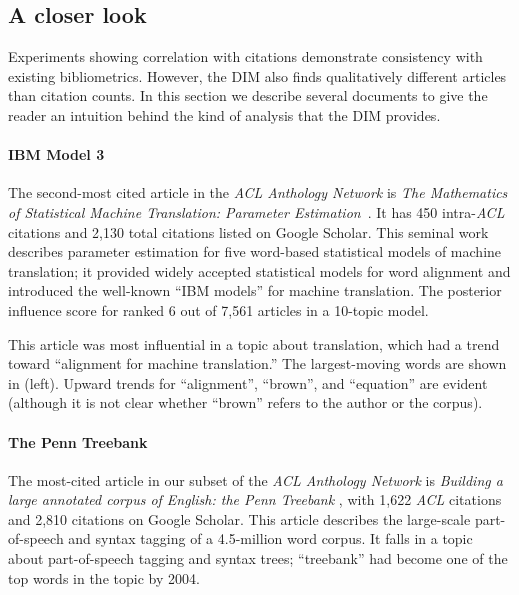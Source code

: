 \subsection*{A closer look}
Experiments showing correlation with citations demonstrate consistency
with existing bibliometrics. However, the DIM also finds qualitatively
different articles than citation counts. In this section we describe
several documents to give the reader an intuition behind the kind of
analysis that the DIM provides.

\paragraph{IBM Model 3} The second-most cited article in the \emph{ACL
  Anthology Network} is \emph{The Mathematics of Statistical Machine
  Translation: Parameter Estimation}~\cite{brown:1993}. It has 450
intra-\emph{ACL} citations and 2,130 total citations listed on Google
Scholar.  This seminal work describes parameter estimation for five
word-based statistical models of machine translation; it provided
widely accepted statistical models for word alignment and introduced
the well-known ``IBM models'' for machine translation. The posterior
influence score for \cite{brown:1993} ranked $6$ out of 7,561   %
articles in a 10-topic model.

This article was most influential in a topic about translation, which
had a trend toward ``alignment for machine translation.''  The
largest-moving words are shown in  (left).
Upward trends for ``alignment'', ``brown'', and ``equation'' are
evident (although it is not clear whether ``brown'' refers to the
author or the corpus).

\paragraph{The Penn Treebank}
The most-cited article in our subset of the \emph{ACL Anthology
  Network} is \emph{Building a large annotated corpus of English: the
  Penn Treebank} \cite{marcus:1993}, with 1,622 \emph{ACL} citations
and 2,810 citations on Google Scholar.  This article describes the
large-scale part-of-speech and syntax tagging of a 4.5-million word
corpus.  It falls in a topic about part-of-speech tagging and syntax
trees; ``treebank'' had become one of the top words in the topic by
2004.


